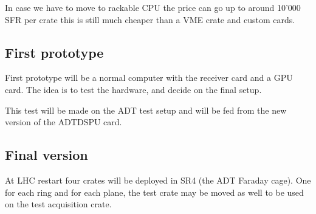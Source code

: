 In case we have to move to rackable \gls{CPU} the price can go up to around 10'000 SFR per crate this is still much cheaper than a \gls{VME} crate and custom cards.

\subsection{First prototype}

First prototype will be a normal computer with the receiver card and a \gls{GPU} card. The idea is to test the hardware, and decide on the final setup.

This test will be made on the \gls{ADT} test setup and will be fed from the new version of the \gls{ADTDSPU} card.

\subsection{Final version}

At \gls{LHC} restart four crates will be deployed in SR4 (the ADT Faraday cage). One for each ring and for each plane, the test crate may be moved as well to be used on the test acquisition crate.